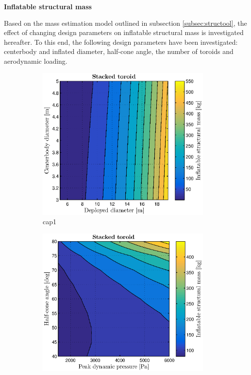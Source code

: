 \textbf{Inflatable structural mass}

Based on the mass estimation model outlined in subsection \ref{subsec:structool}, the effect of changing design parameters on inflatable structural mass is investigated hereafter. To this end, the following design parameters have been investigated: centerbody and inflated diameter, half-cone angle, the number of toroids and aerodynamic loading.

\begin{figure}[h]
	\centering

	\begin{subfigure}[b]{0.49\textwidth}
		\includegraphics[width=0.96\textwidth]{./Figure/Structure/diameters_test.eps}
		\caption{cap1}
		\label{fig:diam}
	\end{subfigure}
	\begin{subfigure}[b]{0.49\textwidth}
		\includegraphics[width=0.96\textwidth]{./Figure/Structure/halfcone_test.eps}

\end{subfigure}
\end{figure}
